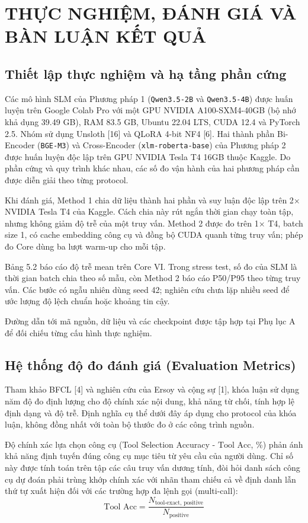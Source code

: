 \chapter{THỰC NGHIỆM, ĐÁNH GIÁ VÀ BÀN LUẬN KẾT QUẢ}

\section{Thiết lập thực nghiệm và hạ tầng phần cứng}

Các mô hình SLM của Phương pháp 1 (\texttt{Qwen3.5-2B} và \texttt{Qwen3.5-4B}) được huấn luyện trên Google Colab Pro với một GPU NVIDIA A100-SXM4-40GB (bộ nhớ khả dụng 39.49 GB), RAM 83.5 GB, Ubuntu 22.04 LTS, CUDA 12.4 và PyTorch 2.5. Nhóm sử dụng Unsloth [16] và QLoRA 4-bit NF4 [6]. Hai thành phần Bi-Encoder (\texttt{BGE-M3}) và Cross-Encoder (\texttt{xlm-roberta-base}) của Phương pháp 2 được huấn luyện độc lập trên GPU NVIDIA Tesla T4 16GB thuộc Kaggle. Do phần cứng và quy trình khác nhau, các số đo vận hành của hai phương pháp cần được diễn giải theo từng protocol.

Khi đánh giá, Method 1 chia dữ liệu thành hai phần và suy luận độc lập trên 2× NVIDIA Tesla T4 của Kaggle. Cách chia này rút ngắn thời gian chạy toàn tập, nhưng không giảm độ trễ của một truy vấn. Method 2 được đo trên 1× T4, batch size 1, có cache embedding công cụ và đồng bộ CUDA quanh từng truy vấn; phép đo Core dùng ba lượt warm-up cho mỗi tập.

Bảng 5.2 báo cáo độ trễ mean trên Core VI. Trong stress test, số đo của SLM là thời gian batch chia theo số mẫu, còn Method 2 báo cáo P50/P95 theo từng truy vấn. Các bước có ngẫu nhiên dùng seed 42; nghiên cứu chưa lặp nhiều seed để ước lượng độ lệch chuẩn hoặc khoảng tin cậy.

Đường dẫn tới mã nguồn, dữ liệu và các checkpoint được tập hợp tại Phụ lục A để đối chiếu từng cấu hình thực nghiệm.

\section{Hệ thống độ đo đánh giá (Evaluation Metrics)}

Tham khảo BFCL [4] và nghiên cứu của Ersoy và cộng sự [1], khóa luận sử dụng năm độ đo định lượng cho độ chính xác nội dung, khả năng từ chối, tính hợp lệ định dạng và độ trễ. Định nghĩa cụ thể dưới đây áp dụng cho protocol của khóa luận, không đồng nhất với toàn bộ thước đo ở các công trình nguồn.

Độ chính xác lựa chọn công cụ (Tool Selection Accuracy - $\text{Tool Acc}$, \%) phản ánh khả năng định tuyến đúng công cụ mục tiêu từ yêu cầu của người dùng. Chỉ số này được tính toán trên tập các câu truy vấn dương tính, đòi hỏi danh sách công cụ dự đoán phải trùng khớp chính xác với nhãn tham chiếu cả về định danh lẫn thứ tự xuất hiện đối với các trường hợp đa lệnh gọi (multi-call):
$$\text{Tool Acc} = \frac{N_{\text{tool-exact, positive}}}{N_{\text{positive}}}$$

